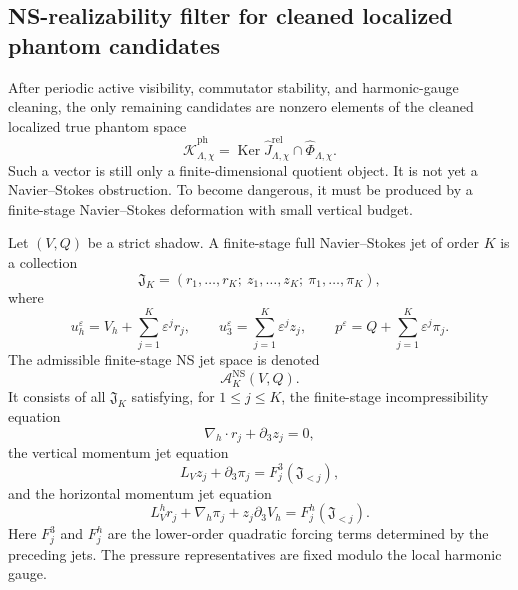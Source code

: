 \documentclass[11pt]{article}
\numberwithin{equation}{section}
\DeclareMathOperator{\Ker}{Ker}
\begin{document}
\subsection{NS-realizability filter for cleaned localized phantom candidates}\label{subsec:NS-realizability-filter-cleaned-phantoms}

After periodic active visibility, commutator stability, and harmonic-gauge cleaning, the only remaining candidates are nonzero elements of the cleaned localized true phantom space
\[
        \widehat{\mathcal K}_{\Lambda,\chi}^{\mathrm{ph}}
        =
        \Ker \widehat J_{\Lambda,\chi}^{\mathrm{rel}}
        \cap
        \widehat\Phi_{\Lambda,\chi}.
\]
Such a vector is still only a finite-dimensional quotient object.  It is not yet a Navier--Stokes obstruction.  To become dangerous, it must be produced by a finite-stage Navier--Stokes deformation with small vertical budget.

Let \((V,Q)\) be a strict shadow.  A finite-stage full Navier--Stokes jet of order \(K\) is a collection
\[
        \mathfrak J_K
        =(r_1,\ldots,r_K;\ z_1,\ldots,z_K;\ \pi_1,\ldots,\pi_K),
\]
where
\[
        u_h^\varepsilon
        =V_h+\sum_{j=1}^K\varepsilon^j r_j,
        \qquad
        u_3^\varepsilon
        =\sum_{j=1}^K\varepsilon^j z_j,
        \qquad
        p^\varepsilon
        =Q+\sum_{j=1}^K\varepsilon^j\pi_j.
\]
The admissible finite-stage NS jet space is denoted
\[
        \mathcal A_K^{\mathrm{NS}}(V,Q).
\]
It consists of all \(\mathfrak J_K\) satisfying, for \(1\le j\le K\), the finite-stage incompressibility equation
\begin{equation}\label{eq:finite-stage-incompressibility}
        \nabla_h\cdot r_j+\partial_3 z_j=0,
\end{equation}
the vertical momentum jet equation
\begin{equation}\label{eq:vertical-momentum-jet}
        L_V z_j+\partial_3\pi_j
        =F_j^3(\mathfrak J_{<j}),
\end{equation}
and the horizontal momentum jet equation
\begin{equation}\label{eq:horizontal-momentum-jet}
        L_V^h r_j+\nabla_h\pi_j+z_j\partial_3V_h
        =F_j^h(\mathfrak J_{<j}).
\end{equation}
Here \(F_j^3\) and \(F_j^h\) are the lower-order quadratic forcing terms determined by the preceding jets.  The pressure representatives are fixed modulo the local harmonic gauge.
\end{document}
